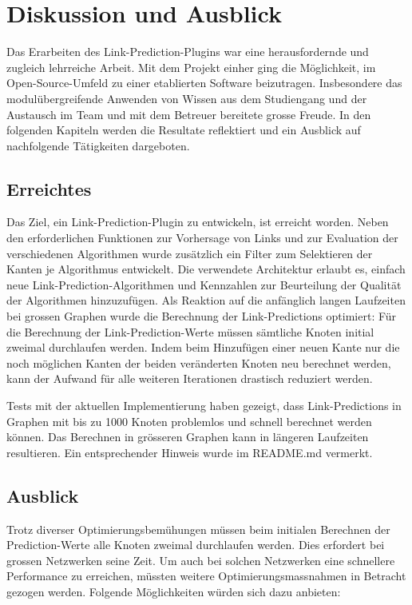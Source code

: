 \chapter{Diskussion und Ausblick}

Das Erarbeiten des Link-Prediction-Plugins war eine herausfordernde und zugleich lehrreiche Arbeit.
Mit dem Projekt einher ging die Möglichkeit, im Open-Source-Umfeld zu einer etablierten Software beizutragen.
Insbesondere das modulübergreifende Anwenden von Wissen aus dem Studiengang und der Austausch im Team und mit dem Betreuer bereitete grosse Freude.
In den folgenden Kapiteln werden die Resultate reflektiert und ein Ausblick auf nachfolgende Tätigkeiten dargeboten.

\section{Erreichtes}

Das Ziel, ein Link-Prediction-Plugin zu entwickeln, ist erreicht worden.
Neben den erforderlichen Funktionen zur Vorhersage von Links und zur Evaluation der verschiedenen Algorithmen wurde zusätzlich ein Filter zum Selektieren der Kanten je Algorithmus entwickelt.
Die verwendete Architektur erlaubt es, einfach neue Link-Prediction-Algorithmen und Kennzahlen zur Beurteilung der Qualität der Algorithmen hinzuzufügen.
Als Reaktion auf die anfänglich langen Laufzeiten bei grossen Graphen wurde die Berechnung der Link-Predictions optimiert:
Für die Berechnung der Link-Prediction-Werte müssen sämtliche Knoten initial zweimal durchlaufen werden.
Indem beim Hinzufügen einer neuen Kante nur die noch möglichen Kanten der beiden veränderten Knoten neu berechnet werden, kann der Aufwand für alle weiteren Iterationen drastisch reduziert werden.

Tests mit der aktuellen Implementierung haben gezeigt, dass Link-Predictions in Graphen mit bis zu 1000 Knoten problemlos und schnell berechnet werden können.
Das Berechnen in grösseren Graphen kann in längeren Laufzeiten resultieren.
Ein entsprechender Hinweis wurde im README.md vermerkt.

\section{Ausblick}

Trotz diverser Optimierungsbemühungen müssen beim initialen Berechnen der Prediction-Werte alle Knoten zweimal durchlaufen werden.
Dies erfordert bei grossen Netzwerken seine Zeit.
Um auch bei solchen Netzwerken eine schnellere Performance zu erreichen, müssten weitere Optimierungsmassnahmen in Betracht gezogen werden.
Folgende Möglichkeiten würden sich dazu anbieten:

